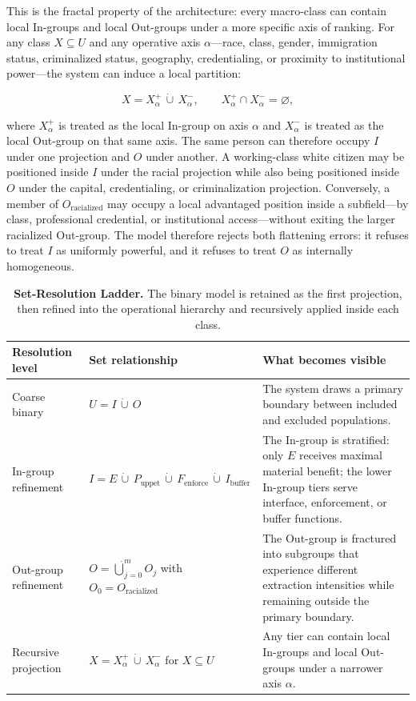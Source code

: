 This is the fractal property of the architecture: every macro-class can contain
local In-groups and local Out-groups under a more specific axis of ranking. For
any class $X \subseteq U$ and any operative axis $\alpha$---race, class, gender,
immigration status, criminalized status, geography, credentialing, or proximity
to institutional power---the system can induce a local partition:

\begin{equation}\label{eq:recursive-local-partition}
X = X^{+}_{\alpha} \,\dot\cup\, X^{-}_{\alpha},
\qquad
X^{+}_{\alpha} \cap X^{-}_{\alpha} = \varnothing ,
\end{equation}

where $X^{+}_{\alpha}$ is treated as the local In-group on axis $\alpha$ and
$X^{-}_{\alpha}$ is treated as the local Out-group on that same axis. The same
person can therefore occupy $I$ under one projection and $O$ under another. A
working-class white citizen may be positioned inside $I$ under the racial
projection while also being positioned inside $O$ under the capital,
credentialing, or criminalization projection. Conversely, a member of
$O_{\text{racialized}}$ may occupy a local advantaged position inside a
subfield---by class, professional credential, or institutional access---without
exiting the larger racialized Out-group. The model therefore rejects both
flattening errors: it refuses to treat $I$ as uniformly powerful, and it refuses
to treat $O$ as internally homogeneous.

\begin{table}[htbp]
\centering
\small
\renewcommand{\arraystretch}{1.25}
\begin{tabularx}{\textwidth}{>{\raggedright\arraybackslash}p{}
>{\raggedright\arraybackslash}p{}
>{\raggedright\arraybackslash}X}
\toprule
\textbf{Resolution level} & \textbf{Set relationship} & \textbf{What becomes visible} \\
\midrule
Coarse binary & $U = I \,\dot\cup\, O$ & The system draws a primary boundary between included and excluded populations. \\
In-group refinement & $I = E \,\dot\cup\, P_{\text{uppet}} \,\dot\cup\, F_{\text{enforce}} \,\dot\cup\, I_{\text{buffer}}$ & The In-group is stratified: only $E$ receives maximal material benefit; the lower In-group tiers serve interface, enforcement, or buffer functions. \\
Out-group refinement & $O = \dot\bigcup_{j=0}^{m} O_j$ with $O_0 = O_{\text{racialized}}$ & The Out-group is fractured into subgroups that experience different extraction intensities while remaining outside the primary boundary. \\
Recursive projection & $X = X^{+}_{\alpha} \,\dot\cup\, X^{-}_{\alpha}$ for $X \subseteq U$ & Any tier can contain local In-groups and local Out-groups under a narrower axis $\alpha$. \\
\bottomrule
\end{tabularx}
\caption{\textbf{Set-Resolution Ladder.} The binary model is retained as the first projection, then refined into the operational hierarchy and recursively applied inside each class.}
\label{tab:set-resolution-ladder}
\end{table}

